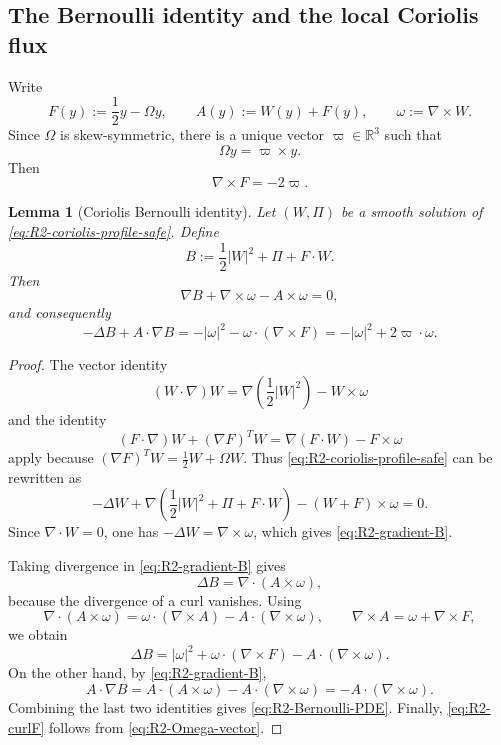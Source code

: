 \documentclass[11pt]{amsart}
\numberwithin{equation}{section}
\theoremstyle{plain}
\newtheorem{lemma}[lemma]{Lemma}
\theoremstyle{definition}
\theoremstyle{remark}
\begin{document}
\subsection{The Bernoulli identity and the local Coriolis flux}

Write
\begin{equation}\label{eq:R2-F-def}
   F(y):=\frac12y-\Omega y,
   \qquad
   A(y):=W(y)+F(y),
   \qquad
   \omega:=\nabla\times W .
\end{equation}
Since \(\Omega\) is skew-symmetric, there is a unique vector
\(\varpi\in\mathbb R^3\) such that
\begin{equation}\label{eq:R2-Omega-vector}
   \Omega y=\varpi\times y .
\end{equation}
Then
\begin{equation}\label{eq:R2-curlF}
   \nabla\times F=-2\varpi .
\end{equation}

\begin{lemma}[Coriolis Bernoulli identity]
\label{lem:R2-coriolis-bernoulli}
Let \((W,\Pi)\) be a smooth solution of
\eqref{eq:R2-coriolis-profile-safe}.  Define
\begin{equation}\label{eq:R2-Bernoulli-def}
   B:=\frac12|W|^2+\Pi+F\cdot W .
\end{equation}
Then
\begin{equation}\label{eq:R2-gradient-B}
   \nabla B+\nabla\times\omega-A\times\omega=0,
\end{equation}
and consequently
\begin{equation}\label{eq:R2-Bernoulli-PDE}
   -\Delta B+A\cdot\nabla B
   =
   -|\omega|^2-\omega\cdot(\nabla\times F)
   =
   -|\omega|^2+2\varpi\cdot\omega .
\end{equation}
\end{lemma}

\begin{proof}
The vector identity
\[
   (W\cdot\nabla)W=\nabla\left(\frac12|W|^2\right)-W\times\omega
\]
and the identity
\[
   (F\cdot\nabla)W+(\nabla F)^TW
   =\nabla(F\cdot W)-F\times\omega
\]
apply because
\((\nabla F)^TW=\frac12W+\Omega W\).  Thus
\eqref{eq:R2-coriolis-profile-safe} can be rewritten as
\[
   -\Delta W+
   \nabla\left(\frac12|W|^2+\Pi+F\cdot W\right)
   -(W+F)\times\omega=0 .
\]
Since \(\nabla\cdot W=0\), one has
\(-\Delta W=\nabla\times\omega\), which gives
\eqref{eq:R2-gradient-B}.

Taking divergence in \eqref{eq:R2-gradient-B} gives
\[
   \Delta B=\nabla\cdot(A\times\omega),
\]
because the divergence of a curl vanishes.  Using
\[
   \nabla\cdot(A\times\omega)
   =\omega\cdot(\nabla\times A)-A\cdot(\nabla\times\omega),
   \qquad
   \nabla\times A=\omega+\nabla\times F,
\]
we obtain
\[
   \Delta B
   =|\omega|^2+\omega\cdot(\nabla\times F)
      -A\cdot(\nabla\times\omega).
\]
On the other hand, by \eqref{eq:R2-gradient-B},
\[
   A\cdot\nabla B
   =A\cdot(A\times\omega)-A\cdot(\nabla\times\omega)
   =-A\cdot(\nabla\times\omega).
\]
Combining the last two identities gives \eqref{eq:R2-Bernoulli-PDE}.  Finally,
\eqref{eq:R2-curlF} follows from \eqref{eq:R2-Omega-vector}.
\end{proof}
\end{document}
